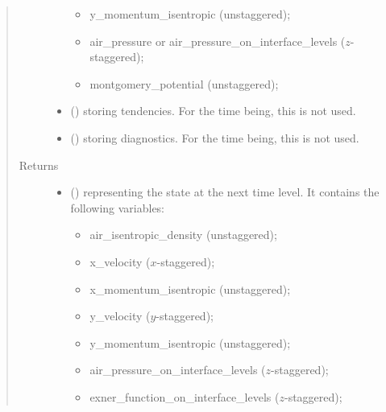 \documentclass[letterpaper,10pt,english]{sphinxmanual}
\begin{document}
\begin{fulllineitems}
\begin{fulllineitems}
\begin{quote}
\begin{description}
\begin{itemize}
\begin{itemize}
\item {} 
y\_momentum\_isentropic (unstaggered);

\item {} 
air\_pressure or air\_pressure\_on\_interface\_levels (\(z\)-staggered);

\item {} 
montgomery\_potential (unstaggered);

\end{itemize}


\item {} 
 () \textendash{} {\hyperref[\detokenize{api:storages.grid_data.GridData}]{}} storing tendencies.
For the time being, this is not used.

\item {} 
 () \textendash{} {\hyperref[\detokenize{api:storages.grid_data.GridData}]{}} storing diagnostics.
For the time being, this is not used.

\end{itemize}

\item[{Returns}] \leavevmode
\begin{itemize}
\item {} 
 () \textendash{} {\hyperref[\detokenize{api:storages.state_isentropic.StateIsentropic}]{}} representing the state at the next time level.
It contains the following variables:
\begin{itemize}
\item {} 
air\_isentropic\_density (unstaggered);

\item {} 
x\_velocity (\(x\)-staggered);

\item {} 
x\_momentum\_isentropic (unstaggered);

\item {} 
y\_velocity (\(y\)-staggered);

\item {} 
y\_momentum\_isentropic (unstaggered);

\item {} 
air\_pressure\_on\_interface\_levels (\(z\)-staggered);

\item {} 
exner\_function\_on\_interface\_levels (\(z\)-staggered);


\end{itemize}
\end{itemize}
\end{description}
\end{quote}
\end{fulllineitems}
\end{fulllineitems}
\end{document}
